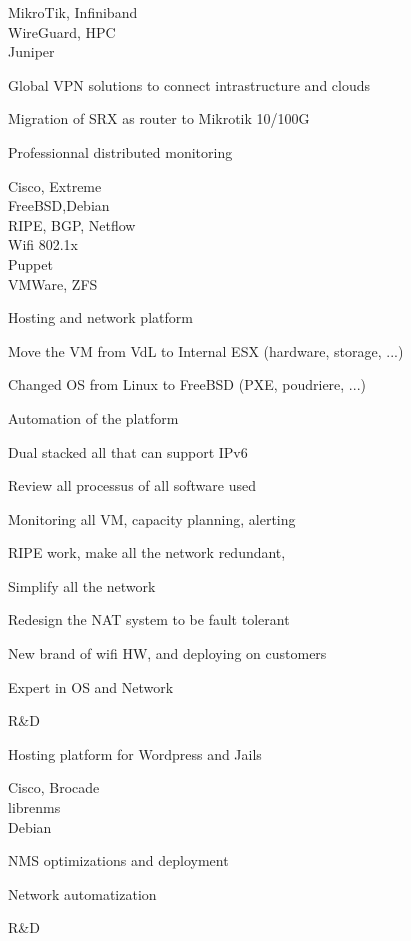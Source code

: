\documentclass[a4paper,11pt]{cv4tw}%
\begin{document}
	
	{MikroTik, Infiniband\\WireGuard, HPC\\Juniper}
		{
		\begin{missions}
			\item Global VPN solutions to connect intrastructure and clouds
			\item Migration of SRX as router to Mikrotik 10/100G
			\item Professionnal distributed monitoring
		\end{missions}
	}

	{Cisco, Extreme\\FreeBSD,Debian\\RIPE, BGP, Netflow\\Wifi 802.1x\\Puppet\\VMWare, ZFS}
		{Hosting and network platform 
		\begin{missions}
			\item Move the VM from VdL to Internal ESX (hardware, storage, ...)
			\item Changed OS from Linux to FreeBSD (PXE, poudriere, ...)
			\item Automation of the platform
			\item Dual stacked all that can support IPv6
			\item Review all processus of all software used
			\item Monitoring all VM, capacity planning, alerting
			\item RIPE work, make all the network redundant,
			\item Simplify all the network
			\item Redesign the NAT system to be fault tolerant
			\item New brand of wifi HW, and deploying on customers
			\item Expert in OS and Network
			\item R\&D 
			\item Hosting platform for Wordpress and Jails
		\end{missions}
	}	

	{Cisco, Brocade\\librenms\\Debian}
		{
		\begin{missions}
			\item NMS optimizations and deployment
			\item Network automatization
			\item R\&D 
		\end{missions}
	}	
\end{document}
